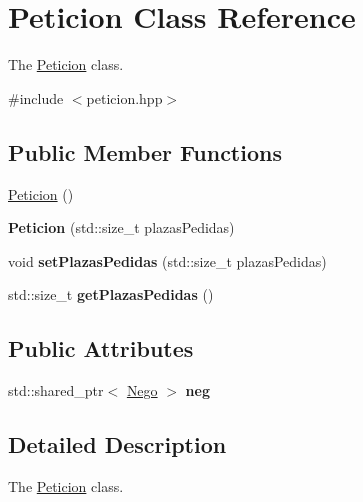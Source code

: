\hypertarget{classPeticion}{}\section{Peticion Class Reference}
\label{classPeticion}


The \hyperlink{classPeticion}{Peticion} class.  




{\ttfamily \#include $<$peticion.\+hpp$>$}

\subsection*{Public Member Functions}
\begin{DoxyCompactItemize}
\item 
\hyperlink{classPeticion_a04b4090032ff49bcbf965bdd2af9ae90}{Peticion} ()
\item 
\hypertarget{classPeticion_adca26c8f1c41bc14c69cad5ac7713e3c}{}{\bfseries Peticion} (std\+::size\+\_\+t plazas\+Pedidas)\label{classPeticion_adca26c8f1c41bc14c69cad5ac7713e3c}

\item 
\hypertarget{classPeticion_a75bbeae7cedba0b5c32993f1f3f9c7e1}{}void {\bfseries set\+Plazas\+Pedidas} (std\+::size\+\_\+t plazas\+Pedidas)\label{classPeticion_a75bbeae7cedba0b5c32993f1f3f9c7e1}

\item 
\hypertarget{classPeticion_a58a129027db952f86676a721c7acc6c4}{}std\+::size\+\_\+t {\bfseries get\+Plazas\+Pedidas} ()\label{classPeticion_a58a129027db952f86676a721c7acc6c4}

\end{DoxyCompactItemize}
\subsection*{Public Attributes}
\begin{DoxyCompactItemize}
\item 
\hypertarget{classPeticion_ac38e3db0706f2889ccd473a7af22d4ec}{}std\+::shared\+\_\+ptr$<$ \hyperlink{classNego}{Nego} $>$ {\bfseries neg}\label{classPeticion_ac38e3db0706f2889ccd473a7af22d4ec}

\end{DoxyCompactItemize}


\subsection{Detailed Description}
The \hyperlink{classPeticion}{Peticion} class. 

